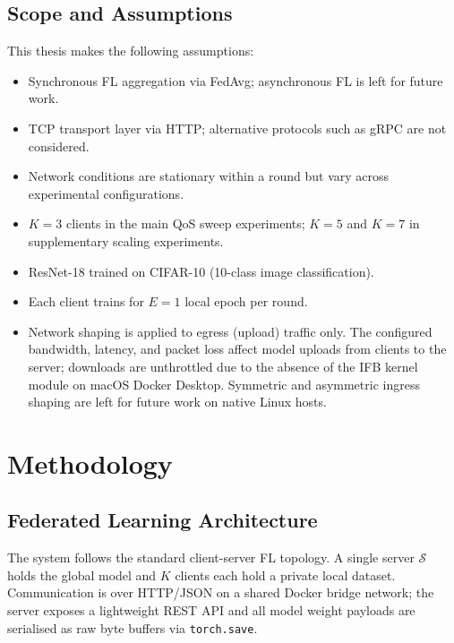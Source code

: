 \documentclass[12pt,a4paper]{report}
\begin{document}
\section{Scope and Assumptions}

This thesis makes the following assumptions:
\begin{itemize}
  \item Synchronous FL aggregation via FedAvg; asynchronous FL is left for future work.
  \item TCP transport layer via HTTP; alternative protocols such as gRPC are
        not considered.
  \item Network conditions are stationary within a round but vary across experimental
        configurations.
  \item $K = 3$ clients in the main QoS sweep experiments; $K = 5$ and
        $K = 7$ in supplementary scaling experiments.
  \item ResNet-18 trained on CIFAR-10 (10-class image classification).
  \item Each client trains for $E = 1$ local epoch per round.
  \item Network shaping is applied to egress (upload) traffic only.  The
        configured bandwidth, latency, and packet loss affect model uploads from
        clients to the server; downloads are unthrottled due to the absence of
        the IFB kernel module on macOS Docker Desktop.  Symmetric and asymmetric
        ingress shaping are left for future work on native Linux hosts.
\end{itemize}

\chapter{Methodology}
\label{ch:method}

\section{Federated Learning Architecture}

The system follows the standard client-server FL topology.  A single server
$\mathcal{S}$ holds the global model and $K$ clients each hold a private local
dataset.  Communication is over HTTP/JSON on a shared Docker bridge network; the
server exposes a lightweight REST API and all model weight payloads are
serialised as raw byte buffers via \texttt{torch.save}.
\end{document}
